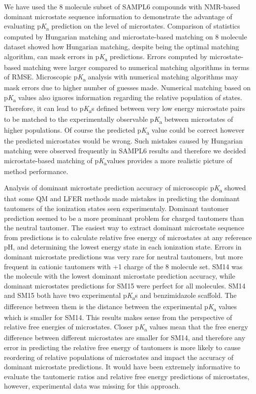 \documentclass[9pt,lineno,final]{elife}
\newcommand{\pKa}{p\textit{K}\textsubscript{a}}
\begin{document}
We have used the 8 molecule subset of SAMPL6 compounds with NMR-based dominant microstate sequence information to demonstrate the advantage of evaluating \pKa{} prediction on the level of microstates.
Comparison of statistics computed by Hungarian matching and microstate-based matching on 8 molecule dataset showed how Hungarian matching, despite being the optimal matching algorithm, can mask errors in \pKa{} predictions. 
Errors computed by microstate-based matching were larger compared to numerical matching algorithms in terms of RMSE.
Microscopic \pKa{} analysis with numerical matching algorithms may mask errors due to higher number of guesses made.
Numerical matching based on \pKa{} values also ignores information regarding the relative population of states. Therefore, it can lead to \pKa{}s defined between very low energy microstate pairs to be matched to the experimentally observable \pKa{} between microstates of higher populations. 
Of course the predicted \pKa{} value could be correct however the predicted microstates would be wrong. Such mistakes caused by Hungarian matching were observed frequently in SAMPL6 results and therefore we decided microstate-based matching of \pKa values provides a more realistic picture of method performance.  

Analysis of dominant microstate prediction accuracy of microscopic \pKa{} showed that some QM and LFER methods made mistakes in predicting the dominant tautomers of the ionization states seen experimentaly. Dominant tautomer prediction seemed to be a more prominant problem for charged tautomers than the neutral tautomer. The easiest way to extract dominant microstate sequence from predictions is to calculate relative free energy of microstates at any reference pH, and determining the lowest energy state in each ionization state. Errors in dominant microstate predictions was very rare for neutral tautomers, but more frequent in cationic tautomers with +1 charge of the 8 molecule set. SM14 was the molecule with the lowest dominant microstate prediction accuracy, while dominant microstates predictions for SM15 were perfect for all molecules. SM14 and SM15 both have two experimental \pKa{}s and benzimidazole scaffold. The difference between them is the distance between the experimental \pKa{} values which is smaller for SM14. This results makes sense from the perspective of relative free energies of microstates. Closer \pKa{} values mean that the free energy difference between different microstates are smaller for SM14, and therefore any error in predicting the relative free energy of tautomers is more likely to cause reordering of relative populations of microstates and impact the accuracy of dominant microstate predictions. 
It would have been extremely informative to evaluate the tautomeric ratios and relative free energy predictions of microstates, however, experimental data was missing for this approach.
\end{document}
